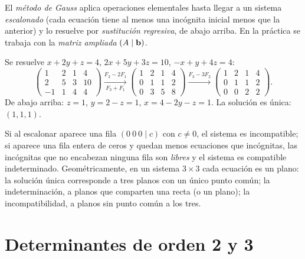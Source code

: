 El \emph{método de Gauss} aplica operaciones elementales hasta llegar a un sistema \emph{escalonado} (cada ecuación tiene al menos una incógnita inicial menos que la anterior) y lo resuelve por \emph{sustitución regresiva}, de abajo arriba. En la práctica se trabaja con la \emph{matriz ampliada} $(A\mid\mathbf{b})$.

\begin{ejemplo}\label{ej:t2-gauss}
Se resuelve $x+2y+z=4$, $2x+5y+3z=10$, $-x+y+4z=4$:
\[
\left(\begin{array}{rrr|r}1&2&1&4\\2&5&3&10\\-1&1&4&4\end{array}\right)
\xrightarrow[F_3+F_1]{F_2-2F_1}
\left(\begin{array}{rrr|r}1&2&1&4\\0&1&1&2\\0&3&5&8\end{array}\right)
\xrightarrow{F_3-3F_2}
\left(\begin{array}{rrr|r}1&2&1&4\\0&1&1&2\\0&0&2&2\end{array}\right).
\]
De abajo arriba: $z=1$, $y=2-z=1$, $x=4-2y-z=1$. La solución es única: $(1,1,1)$.
\end{ejemplo}

Si al escalonar aparece una fila $(0\ 0\ 0\mid c)$ con $c\neq0$, el sistema es incompatible; si aparece una fila entera de ceros y quedan menos ecuaciones que incógnitas, las incógnitas que no encabezan ninguna fila son \emph{libres} y el sistema es compatible indeterminado. Geométricamente, en un sistema $3\times3$ cada ecuación es un plano: la solución única corresponde a tres planos con un único punto común; la indeterminación, a planos que comparten una recta (o un plano); la incompatibilidad, a planos sin punto común a los tres.

\section{Determinantes de orden 2 y 3}

